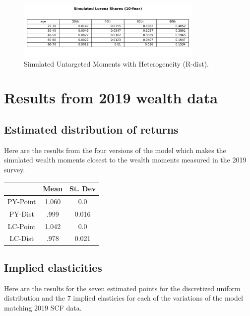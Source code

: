 \begin{figure}[htbp]
\centering
\includegraphics[width=0.8\textwidth]{Tables/Sim_Lorenz_10yr_LCrrDistNetWorth_2016.png}
\caption{Simulated Untargeted Moments with Heterogeneity (R-dist).}
\label{fig:SimLorenzTarDist2016}
\end{figure}

\section{Results from 2019 wealth data}

\subsection{Estimated distribution of returns}

\par Here are the results from the four versions of the model  which makes the simulated wealth moments closest to the wealth moments measured in the 2019 survey.

\begin{center}
    \begin{tabular}{|c|c|c|}
\hline
& Mean & St. Dev \\
\hline
PY-Point & 1.060 & 0.0  \\
PY-Dist & .999  &  0.016  \\
LC-Point & 1.042 & 0.0  \\
LC-Dist & .978  &  0.021 \\
\hline
    \end{tabular}
    \end{center}

\subsection{Implied elasticities}
    
\par Here are the results for the seven estimated points for the discretized uniform distribution and the 7 implied elasticies for each of the variations of the model matching 2019 SCF data. 


